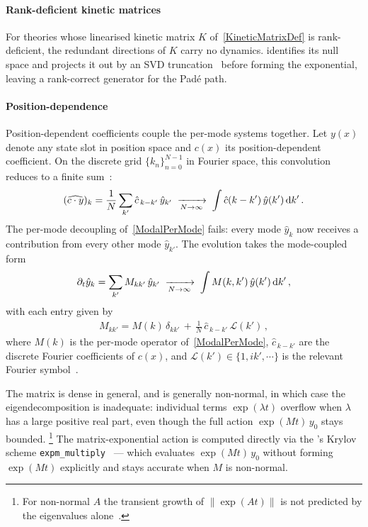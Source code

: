 \paragraph*{Rank-deficient kinetic matrices}%
\label{SVDNullSpace}
For theories whose linearised kinetic matrix $K$
of~\cref{KineticMatrixDef} is rank-deficient, the redundant directions
of $K$ carry no dynamics. \TIDAL{} identifies its null space and
projects it out by an SVD
truncation~\cite[\S~5.5]{golub2013matrix} before forming the
exponential, leaving a rank-correct generator for the Pad\'e path.

\paragraph*{Position-dependence}
Position-dependent coefficients couple the per-mode systems together.
Let $y(x)$ denote any state slot in position space and $c(x)$ its
position-dependent coefficient. On the discrete grid $\{k_n\}_{n=0}^{N-1}$
in Fourier space, this convolution reduces to a finite sum~\cite{cooley1965fft}:
\begin{align}
  (\widehat{c \cdot y})_k
  = \frac{1}{N}\sum_{k'} \hat c_{\,k-k'}\, \hat y_{k'}
  \;\xrightarrow[N\to\infty]{}\;
  \int \hat c(k - k')\, \hat y(k')\, \mathrm{d} k'
  \, .
  \label{ModalConvolution}
\end{align}
The per-mode decoupling of~\cref{ModalPerMode} fails: every mode
$\hat y_k$ now receives a contribution from every other mode
$\hat y_{k'}$. The evolution takes the
mode-coupled form
\begin{align}
  \partial_t \hat y_k
  = \sum_{k'} M_{k k'}\, \hat y_{k'}
  \;\xrightarrow[N\to\infty]{}\;
  \int M(k, k')\, \hat y(k')\, \mathrm{d} k'
  \, ,
  \label{ModalCoupled}
\end{align}
with each entry given by
\begin{align}
  M_{k k'} = M(k)\,\delta_{k k'}
  \,+\, \tfrac{1}{N}\,\hat c_{\,k-k'}\,\mathcal{L}(k')
  \, ,
  \label{ModalCoupledEntry}
\end{align}
where $M(k)$ is the per-mode operator
of~\cref{ModalPerMode}, $\hat c_{\,k-k'}$ are the discrete Fourier
coefficients of $c(x)$, and $\mathcal{L}(k') \in \{1,i k',\cdots\}$ is the relevant
Fourier symbol~\cite{boyd2001chebyshev}.

The matrix is dense in general, and is generally non-normal, in which
case the eigendecomposition is inadequate: individual terms
$\exp(\lambda t)$ overflow when $\lambda$ has a large positive real
part, even though the full action $\exp(M t)\, y_0$ stays bounded.%
\footnote{For non-normal $A$ the transient growth of $\|\exp(A t)\|$
is not predicted by the eigenvalues alone~\cite[\S~15]{trefethen2005spectra}.}
The matrix-exponential action is computed directly via the
\SciPy{}'s Krylov scheme
\lstinline!expm_multiply!~\cite{almohy2011action} ---
which evaluates $\exp(Mt)\,y_0$ without forming $\exp(Mt)$ explicitly
and stays accurate when $M$ is non-normal.

